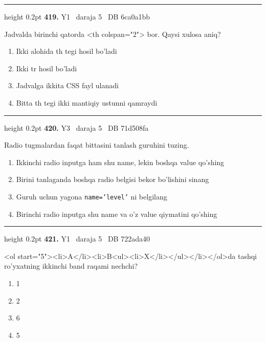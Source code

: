 \documentclass[10pt,a4paper,oneside]{article}
\begin{document}
\vspace{2mm}\hrule height 0.2pt \vspace{4mm}
\hypertarget{q419}{\textbf{\color{ink}419.}}  {\color{muted}\scriptsize Y1 \textbullet\ daraja 5 \textbullet\ DB 6ca0a1bb}
\par
Jadvalda birinchi qatorda \textless{}th colspan="2"\textgreater{} bor. Qaysi xulosa aniq?
\begin{enumerate}[label=\Alph*),leftmargin=9mm]
\item Ikki alohida th tegi hosil bo'ladi
\item Ikki tr hosil bo'ladi
\item Jadvalga ikkita CSS fayl ulanadi
\item Bitta th tegi ikki mantiqiy ustunni qamraydi
\end{enumerate}
\vspace{2mm}\hrule height 0.2pt \vspace{4mm}
\hypertarget{q420}{\textbf{\color{ink}420.}}  {\color{muted}\scriptsize Y3 \textbullet\ daraja 5 \textbullet\ DB 71d508fa}
\par
Radio tugmalardan faqat bittasini tanlash guruhini tuzing.
\begin{enumerate}[label=\Alph*),leftmargin=9mm]
\item Ikkinchi radio inputga ham shu name, lekin boshqa value qo'shing
\item Birini tanlaganda boshqa radio belgisi bekor bo'lishini sinang
\item Guruh uchun yagona \texttt{name='level'} ni belgilang
\item Birinchi radio inputga shu name va o'z value qiymatini qo'shing
\end{enumerate}
\vspace{2mm}\hrule height 0.2pt \vspace{4mm}
\hypertarget{q421}{\textbf{\color{ink}421.}}  {\color{muted}\scriptsize Y1 \textbullet\ daraja 5 \textbullet\ DB 722ada40}
\par
\textless{}ol start="5"\textgreater{}\textless{}li\textgreater{}A\textless{}/li\textgreater{}\textless{}li\textgreater{}B\textless{}ul\textgreater{}\textless{}li\textgreater{}X\textless{}/li\textgreater{}\textless{}/ul\textgreater{}\textless{}/li\textgreater{}\textless{}/ol\textgreater{}da tashqi ro'yxatning ikkinchi band raqami nechchi?
\begin{enumerate}[label=\Alph*),leftmargin=9mm]
\item 1
\item 2
\item 6
\item 5
\end{enumerate}
\end{document}

